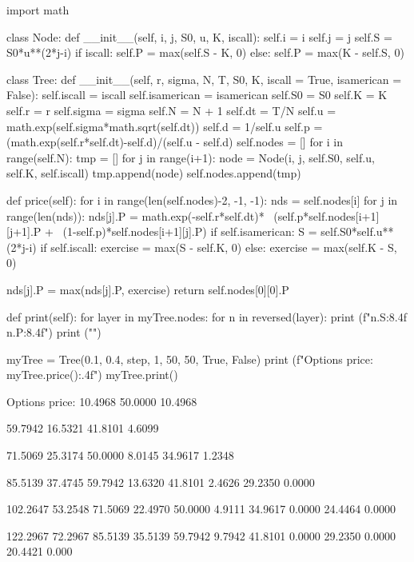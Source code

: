 \begin{ipython}
import math

class Node:
    def __init__(self, i, j, S0, u, K, iscall):
        self.i = i
        self.j = j
        self.S = S0*u**(2*j-i)
        if iscall:
            self.P = max(self.S - K, 0)
        else:
            self.P = max(K - self.S, 0)
        
class Tree:
    def __init__(self, r, sigma, N, T, S0, K, iscall = True, isamerican = False):
        self.iscall = iscall
        self.isamerican = isamerican
        self.S0 = S0
        self.K = K
        self.r = r
        self.sigma = sigma
        self.N = N + 1
        self.dt = T/N
        self.u = math.exp(self.sigma*math.sqrt(self.dt))
        self.d = 1/self.u
        self.p = (math.exp(self.r*self.dt)-self.d)/(self.u - self.d)
        self.nodes = []
        for i in range(self.N):
            tmp = []
            for j in range(i+1):
                node = Node(i, j, self.S0, self.u, self.K, self.iscall)
                tmp.append(node)
            self.nodes.append(tmp)
            
    def price(self):
        for i in range(len(self.nodes)-2, -1, -1):
            nds = self.nodes[i]
            for j in range(len(nds)):
                nds[j].P = math.exp(-self.r*self.dt)* \
                                (self.p*self.nodes[i+1][j+1].P + \
                                (1-self.p)*self.nodes[i+1][j].P)
                if self.isamerican:
                    S = self.S0*self.u**(2*j-i)
                    if self.iscall:
                        exercise = max(S - self.K, 0)
                    else:
                        exercise = max(self.K - S, 0)

                    nds[j].P = max(nds[j].P, exercise)
        return self.nodes[0][0].P
            
    def print(self):
        for layer in myTree.nodes:
            for n in reversed(layer):
                print (f"{n.S:8.4f} {n.P:8.4f}") 
            print ("")

myTree = Tree(0.1, 0.4, step, 1, 50, 50, True, False)    
print (f"Options price: {myTree.price():.4f}")
myTree.print()
\end{ipython}
\begin{ioutput}
Options price: 10.4968
 50.0000  10.4968

 59.7942  16.5321
 41.8101   4.6099

 71.5069  25.3174
 50.0000   8.0145
 34.9617   1.2348

 85.5139  37.4745
 59.7942  13.6320
 41.8101   2.4626
 29.2350   0.0000

102.2647  53.2548
 71.5069  22.4970
 50.0000   4.9111
 34.9617   0.0000
 24.4464   0.0000

122.2967  72.2967
 85.5139  35.5139
 59.7942   9.7942
 41.8101   0.0000
 29.2350   0.0000
 20.4421   0.000
\end{ioutput}

